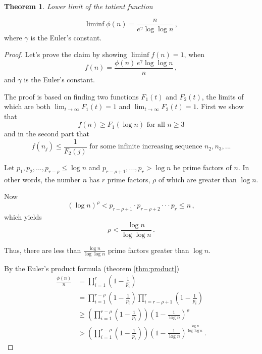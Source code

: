 \documentclass{article}
\theoremstyle{definition}
\newtheorem{theorem}[subsubsection]{Theorem}
\begin{document}
\begin{theorem}{\emph{Lower limit of the totient function}}

\begin{equation*}
    \liminf{\phi(n)}=\frac{n}{e^\gamma\log\log n}\,,
\end{equation*}
where $\gamma$ is the Euler's constant.

\begin{proof}

Let's prove the claim by showing $\liminf{f(n)} = 1$, when
\begin{equation*}
    f(n)= \frac{\phi(n)\,e^\gamma \log\log n}{n}\,,
\end{equation*}
and $\gamma$ is the Euler's constant.

The proof is based on finding two functions $F_1(t)$ and $F_2(t)$, the limits of which are both $\lim_{t\rightarrow \infty} F_1(t) = 1$ and $\lim_{t\rightarrow \infty} F_2(t) = 1$. First we show that 
\begin{equation}
\label{eq:first}
    f(n) \geq F_1(\log n)\text{ for all }n\geq 3
\end{equation}
and in the second part that
\begin{equation}
\label{eq:second}
    f(n_j) \leq \frac{1}{F_2(j)}\text{ for some infinite increasing sequence }n_2, n_3,...
\end{equation}

Let $p_1,p_2,...,p_{r-\rho} \leq \log n$ and $p_{r-\rho+1},...,p_r > \log n$ be prime factors of $n$. In other words, the number $n$ has $r$ prime factors, $\rho$ of which are greater than $\log n$.

Now
\begin{equation*}
    (\log n)^\rho < p_{r-\rho+1} \cdot p_{r-\rho+2} \cdot \cdot \cdot p_r \leq n\,,
\end{equation*}
which yields
\begin{equation*}
    \rho < \frac{\log n}{\log\log n}\,.
\end{equation*}

Thus, there are less than $\frac{\log n}{\log\log n}$ prime factors greater than $\log n$.

By the Euler's product formula (theorem \ref{thm:product})
\begin{align*}
    \frac{\phi(n)}{n} & = \prod_{i=1}^r\left(1-\frac{1}{p_i}\right)\\
    & = \prod_{i=1}^{r-\rho}\left(1-\frac{1}{p_i}\right) \prod_{i=r-\rho+1}^r\left(1-\frac{1}{p_i}\right)\\
    & \geq \left(\prod_{i=1}^{r-\rho}\left(1-\frac{1}{p_i}\right)\right) \left(1-\frac{1}{\log n}\right)^\rho\\
    & > \left(\prod_{i=1}^{r-\rho}\left(1-\frac{1}{p_i}\right)\right) \left(1-\frac{1}{\log n}\right)^\frac{\log n}{\log \log n}\,.
\end{align*}


\end{proof}
\end{theorem}
\end{document}
